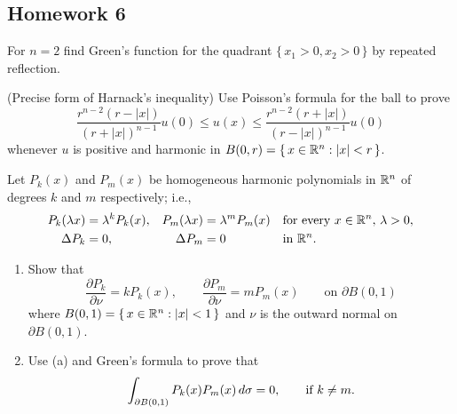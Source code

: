 \subsection{Homework 6}
\begin{problem}
  For \(n=2\) find Green's function for the quadrant
  \(\{\,x_1>0,x_2>0\,\}\) by repeated reflection.
\end{problem}
\begin{solution*}
\end{solution*}

\begin{problem}
  (Precise form of Harnack's inequality) Use Poisson's formula for the ball
  to prove
  \[
    \frac{r^{n-2}(r-|x|)}{(r+|x|)^{n-1}}u(0)%
    \leq u(x)%
    \leq \frac{r^{n-2}(r+|x|)}{(r-|x|)^{n-1}}u(0)
  \]
  whenever \(u\) is positive and harmonic in
  \(B(0,r)=\{\,x\in\mathbb{R}^n:|x|<r\,\}\).
\end{problem}
\begin{solution*}
\end{solution*}

\begin{problem}
  Let \(P_k(x)\) and \(P_m(x)\) be homogeneous harmonic polynomials in
  \(\mathbb{R}^n\) of degrees \(k\) and \(m\) respectively; i.e.,
  \begin{align*}
    P_k(\lambda x)&=\lambda^k P_k(x),&P_m(\lambda x)&=\lambda^m P_m(x)
    &&\text{for every \(x\in\mathbb{R}^n\), \(\lambda>0\),}\\
    \Delta P_k&=0,&\Delta P_m&=0&&\text{in \(\mathbb{R}^n\).}
  \end{align*}
  \begin{enumerate}[label=(\alph*),noitemsep]
  \item Show that
    \[
      \frac{\partial P_k}{\partial \nu}=kP_k(x),\qquad
      \frac{\partial P_m}{\partial\nu}=mP_m(x)\qquad\text{on \(\partial B(0,1)\)}
    \]
    where \(B(0,1)=\{\,x\in\mathbb{R}^n:|x|<1\,\}\) and \(\nu\) is the outward
    normal on \(\partial B(0,1)\).
  \item Use (a) and Green's formula to prove that
    \[
      \int_{\partial B(0,1)}P_k(x)P_m(x)\mathop{}\!d\sigma=0,\qquad\text{if
        \(k\neq m\).}
    \]
  \end{enumerate}
\end{problem}
\begin{solution*}
\end{solution*}

